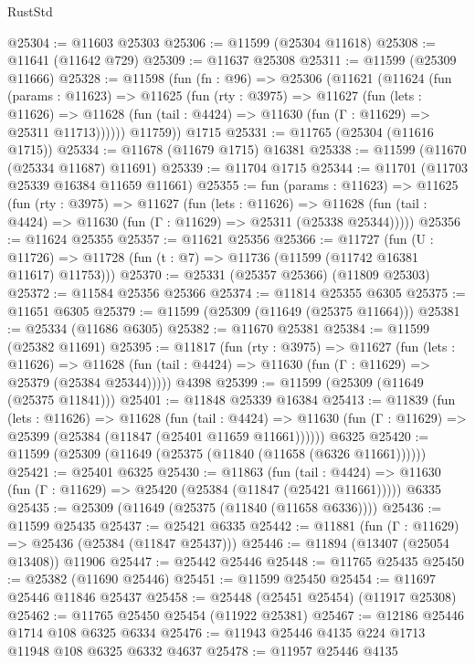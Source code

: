 \begin{lexlean}{RustStd}
\begin{coremodule}
@25304 := @11603 @25303
@25306 := @11599 (@25304 @11618)
@25308 := @11641 (@11642 @729)
@25309 := @11637 @25308
@25311 := @11599 (@25309 @11666)
@25328 := @11598
    (fun (fn : @96) =>
    @25306
      (@11621
        (@11624
          (fun (params : @11623) =>
          @11625
            (fun (rty : @3975) =>
            @11627
              (fun (lets : @11626) =>
              @11628 (fun (tail : @4424) => @11630 (fun (Γ : @11629) => @25311 @11713))))))
        @11759))
    @1715
@25331 := @11765 (@25304 (@11616 @1715))
@25334 := @11678 (@11679 @1715) @16381
@25338 := @11599 (@11670 (@25334 @11687) @11691)
@25339 := @11704 @1715
@25344 := @11701 (@11703 @25339 @16384 @11659 @11661)
@25355 := fun (params : @11623) =>
  @11625
    (fun (rty : @3975) =>
    @11627
      (fun (lets : @11626) =>
      @11628 (fun (tail : @4424) => @11630 (fun (Γ : @11629) => @25311 (@25338 @25344)))))
@25356 := @11624 @25355
@25357 := @11621 @25356
@25366 := @11727
    (fun (U : @11726) => @11728 (fun (t : @7) => @11736 (@11599 (@11742 @16381 @11617) @11753)))
@25370 := @25331 (@25357 @25366) (@11809 @25303)
@25372 := @11584 @25356 @25366
@25374 := @11814 @25355 @6305
@25375 := @11651 @6305
@25379 := @11599 (@25309 (@11649 (@25375 @11664)))
@25381 := @25334 (@11686 @6305)
@25382 := @11670 @25381
@25384 := @11599 (@25382 @11691)
@25395 := @11817
    (fun (rty : @3975) =>
    @11627
      (fun (lets : @11626) =>
      @11628 (fun (tail : @4424) => @11630 (fun (Γ : @11629) => @25379 (@25384 @25344)))))
    @4398
@25399 := @11599 (@25309 (@11649 (@25375 @11841)))
@25401 := @11848 @25339 @16384
@25413 := @11839
    (fun (lets : @11626) =>
    @11628
      (fun (tail : @4424) =>
      @11630 (fun (Γ : @11629) => @25399 (@25384 (@11847 (@25401 @11659 @11661))))))
    @6325
@25420 := @11599 (@25309 (@11649 (@25375 (@11840 (@11658 (@6326 @11661))))))
@25421 := @25401 @6325
@25430 := @11863
    (fun (tail : @4424) => @11630 (fun (Γ : @11629) => @25420 (@25384 (@11847 (@25421 @11661)))))
    @6335
@25435 := @25309 (@11649 (@25375 (@11840 (@11658 @6336))))
@25436 := @11599 @25435
@25437 := @25421 @6335
@25442 := @11881 (fun (Γ : @11629) => @25436 (@25384 (@11847 @25437)))
@25446 := @11894 (@13407 (@25054 @13408)) @11906
@25447 := @25442 @25446
@25448 := @11765 @25435
@25450 := @25382 (@11690 @25446)
@25451 := @11599 @25450
@25454 := @11697 @25446 @11846 @25437
@25458 := @25448 (@25451 @25454) (@11917 @25308)
@25462 := @11765 @25450 @25454 (@11922 @25381)
@25467 := @12186 @25446 @1714 @108 @6325 @6334
@25476 := @11943 @25446 @4135 @224 @1713 @11948 @108 @6325 @6332 @4637
@25478 := @11957 @25446 @4135

\end{coremodule}
\end{lexlean}
